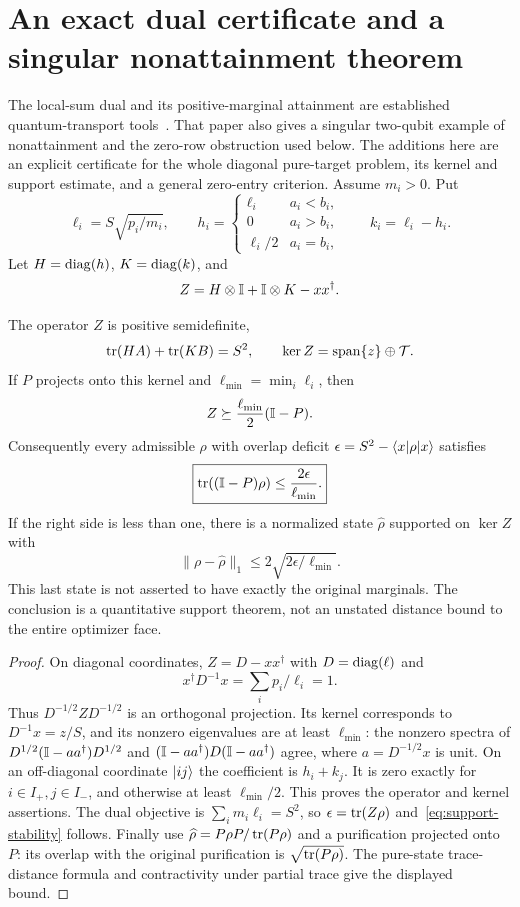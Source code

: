 \section{An exact dual certificate and a singular nonattainment theorem}\label{sec:dual}
The local-sum dual and its positive-marginal attainment are established quantum-transport tools~\cite{cole2023}. That paper also gives a singular two-qubit example of nonattainment and the zero-row obstruction used below. The additions here are an explicit certificate for the whole diagonal pure-target problem, its kernel and support estimate, and a general zero-entry criterion. Assume $m_i>0$. Put
\[
 \ell_i=S\sqrt{p_i/m_i},\qquad
 h_i=\begin{cases}\ell_i&a_i<b_i,\\0&a_i>b_i,\\\ell_i/2&a_i=b_i,\end{cases}
 \qquad k_i=\ell_i-h_i.
\]
Let $H=\operatorname{diag}(h)$, $K=\operatorname{diag}(k)$, and
\[
 Z=H\otimes\mathbb I+\mathbb I\otimes K-xx^\dagger.
\]
\begin{theorem}\label{thm:dual}
The operator $Z$ is positive semidefinite,
\[
 \operatorname{tr}(HA)+\operatorname{tr}(KB)=S^2,
 \qquad \ker Z=\operatorname{span}\{z\}\oplus\mathcal T.
\]
If $P$ projects onto this kernel and $\ell_{\min}=\min_i\ell_i$, then
\[
 Z\succeq\frac{\ell_{\min}}2(\mathbb I-P).
\]
Consequently every admissible $\rho$ with overlap deficit $\epsilon=S^2-\langle x\rvert\rho\lvert x\rangle$ satisfies
\begin{equation}\label{eq:support-stability}
 \boxed{\operatorname{tr}((\mathbb I-P)\rho)\le\frac{2\epsilon}{\ell_{\min}}.}
\end{equation}
If the right side is less than one, there is a normalized state $\widehat\rho$ supported on $\ker Z$ with
\[
 \|\rho-\widehat\rho\|_1\le2\sqrt{2\epsilon/\ell_{\min}}.
\]
This last state is not asserted to have exactly the original marginals. The conclusion is a quantitative support theorem, not an unstated distance bound to the entire optimizer face.
\end{theorem}
\begin{proof}
On diagonal coordinates, $Z=D-xx^\dagger$ with $D=\operatorname{diag}(\ell)$ and
\[
 x^\dagger D^{-1}x=\sum_i p_i/\ell_i=1.
\]
Thus $D^{-1/2}ZD^{-1/2}$ is an orthogonal projection. Its kernel corresponds to $D^{-1}x=z/S$, and its nonzero eigenvalues are at least $\ell_{\min}$: the nonzero spectra of $D^{1/2}(\mathbb I-aa^\dagger)D^{1/2}$ and $(\mathbb I-aa^\dagger)D(\mathbb I-aa^\dagger)$ agree, where $a=D^{-1/2}x$ is unit. On an off-diagonal coordinate $\lvert ij\rangle$ the coefficient is $h_i+k_j$. It is zero exactly for $i\in I_+,j\in I_-$, and otherwise at least $\ell_{\min}/2$. This proves the operator and kernel assertions. The dual objective is $\sum_i m_i\ell_i=S^2$, so $\epsilon=\operatorname{tr}(Z\rho)$ and~\eqref{eq:support-stability} follows. Finally use $\widehat\rho=P\rho P/\operatorname{tr}(P\rho)$ and a purification projected onto $P$: its overlap with the original purification is $\sqrt{\operatorname{tr}(P\rho)}$. The pure-state trace-distance formula and contractivity under partial trace give the displayed bound.
\end{proof}

